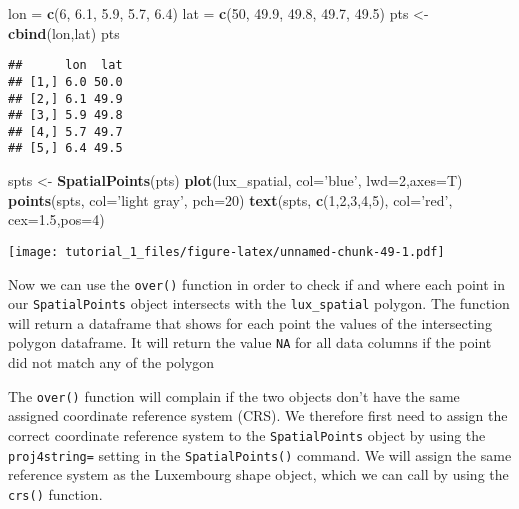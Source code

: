 \documentclass[]{article}
\newenvironment{Shaded}{\begin{snugshade}}{\end{snugshade}}
\newcommand{\DataTypeTok}[1]{\textcolor[rgb]{0.13,0.29,0.53}{#1}}
\newcommand{\DecValTok}[1]{\textcolor[rgb]{0.00,0.00,0.81}{#1}}
\newcommand{\FloatTok}[1]{\textcolor[rgb]{0.00,0.00,0.81}{#1}}
\newcommand{\KeywordTok}[1]{\textcolor[rgb]{0.13,0.29,0.53}{\textbf{#1}}}
\newcommand{\NormalTok}[1]{#1}
\newcommand{\StringTok}[1]{\textcolor[rgb]{0.31,0.60,0.02}{#1}}
\begin{document}
\begin{Shaded}
\begin{Highlighting}[]
\NormalTok{lon =}\StringTok{ }\KeywordTok{c}\NormalTok{(}\DecValTok{6}\NormalTok{, }\FloatTok{6.1}\NormalTok{, }\FloatTok{5.9}\NormalTok{, }\FloatTok{5.7}\NormalTok{, }\FloatTok{6.4}\NormalTok{)}
\NormalTok{lat =}\StringTok{ }\KeywordTok{c}\NormalTok{(}\DecValTok{50}\NormalTok{, }\FloatTok{49.9}\NormalTok{, }\FloatTok{49.8}\NormalTok{, }\FloatTok{49.7}\NormalTok{, }\FloatTok{49.5}\NormalTok{)}
\NormalTok{pts <-}\StringTok{ }\KeywordTok{cbind}\NormalTok{(lon,lat)}
\NormalTok{pts}
\end{Highlighting}
\end{Shaded}

\begin{verbatim}
##      lon  lat
## [1,] 6.0 50.0
## [2,] 6.1 49.9
## [3,] 5.9 49.8
## [4,] 5.7 49.7
## [5,] 6.4 49.5
\end{verbatim}

\begin{Shaded}
\begin{Highlighting}[]
\NormalTok{spts <-}\StringTok{ }\KeywordTok{SpatialPoints}\NormalTok{(pts)}
\KeywordTok{plot}\NormalTok{(lux_spatial, }\DataTypeTok{col=}\StringTok{'blue'}\NormalTok{, }\DataTypeTok{lwd=}\DecValTok{2}\NormalTok{,}\DataTypeTok{axes=}\NormalTok{T)}
\KeywordTok{points}\NormalTok{(spts, }\DataTypeTok{col=}\StringTok{'light gray'}\NormalTok{, }\DataTypeTok{pch=}\DecValTok{20}\NormalTok{)}
\KeywordTok{text}\NormalTok{(spts, }\KeywordTok{c}\NormalTok{(}\DecValTok{1}\NormalTok{,}\DecValTok{2}\NormalTok{,}\DecValTok{3}\NormalTok{,}\DecValTok{4}\NormalTok{,}\DecValTok{5}\NormalTok{), }\DataTypeTok{col=}\StringTok{'red'}\NormalTok{, }\DataTypeTok{cex=}\FloatTok{1.5}\NormalTok{,}\DataTypeTok{pos=}\DecValTok{4}\NormalTok{)}
\end{Highlighting}
\end{Shaded}

\texttt{[image: tutorial\_1\_files/figure-latex/unnamed-chunk-49-1.pdf]}

Now we can use the \texttt{over()} function in order to check if and
where each point in our \texttt{SpatialPoints} object intersects with
the \texttt{lux\_spatial} polygon. The function will return a dataframe
that shows for each point the values of the intersecting polygon
dataframe. It will return the value \texttt{NA} for all data columns if
the point did not match any of the polygon

The \texttt{over()} function will complain if the two objects don't have
the same assigned coordinate reference system (CRS). We therefore first
need to assign the correct coordinate reference system to the
\texttt{SpatialPoints} object by using the \texttt{proj4string=} setting
in the \texttt{SpatialPoints()} command. We will assign the same
reference system as the Luxembourg shape object, which we can call by
using the \texttt{crs()} function.
\end{document}

